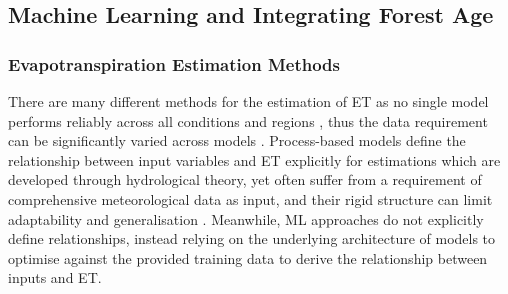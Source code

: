 \documentclass[paper=a4,fontsize=12pt]{scrartcl}
\begin{document}
\subsection{Machine Learning and Integrating Forest Age}
\subsubsection{Evapotranspiration Estimation Methods}
There are many different methods for the estimation of ET as no single model performs reliably across all conditions and regions \parencite{derardja2024advancements}, thus the data requirement can be significantly varied across models \parencite{zhao2013evapotranspiration}. Process-based models define the relationship between input variables and ET explicitly for estimations which are developed through hydrological theory, yet often suffer from a requirement of comprehensive meteorological data as input, and their rigid structure can limit adaptability and generalisation \parencite{amani2023review}. Meanwhile, ML approaches do not explicitly define relationships, instead relying on the underlying architecture of models to optimise against the provided training data  to derive the relationship between inputs and ET. 

\end{document}

